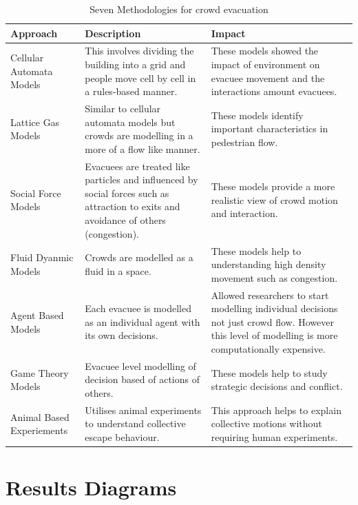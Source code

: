 \documentclass[12pt,a4paper]{report}
\begin{document}
\begin{table}[htb]
  \bigskip
  \begin{center}
    \begin{tabular}{| p{3cm} | p{6cm} | p{6cm} |}
      \hline
      Approach & Description & Impact \\
      \hline
      \hline
      Cellular Automata Models & This involves dividing the building into a grid and people move cell by cell in a rules-based manner. & These models showed the impact of environment on evacuee movement and the interactions amount evacuees. \\
      \hline
      Lattice Gas Models & Similar to cellular automata models but crowds are modelling in a more of a flow like manner. & These models identify important characteristics in pedestrian flow. \\
      \hline
      Social Force Models & Evacuees are treated like particles and influenced by social forces such as attraction to exits and avoidance of others (congestion). & These models provide a more realistic view of crowd motion and interaction. \\
      \hline
      Fluid Dyanmic Models &  Crowds are modelled as a fluid in a space. & These models help to understanding high density movement such as congestion. \\
      \hline
      Agent Based Models & Each evacuee is modelled as an individual agent with its own decisions.& Allowed researchers to start modelling individual decisions not just crowd flow. However this level of modelling is more computationally expensive. \\
      \hline
      Game Theory Models & Evacuee level modelling of decision based of actions of others. & These models help to study strategic decisions and conflict.  \\
      \hline
      Animal Based Experiements & Utilises animal experiments to understand collective escape behaviour. & This approach helps to explain collective motions without requiring human experiments. \\

      \hline
    \end{tabular}
  \end{center}
\caption{Seven Methodologies for crowd evacuation}
\end{table}


\chapter{Results Diagrams}
\end{document}
